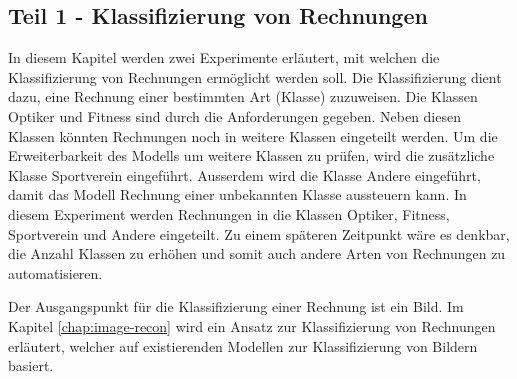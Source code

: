 \subsection{Teil 1 - Klassifizierung von Rechnungen}

In diesem Kapitel werden zwei Experimente erläutert, mit welchen die Klassifizierung von Rechnungen ermöglicht werden soll. Die Klassifizierung dient dazu, eine Rechnung einer bestimmten Art (Klasse) zuzuweisen. Die Klassen Optiker und Fitness sind durch die Anforderungen gegeben. Neben diesen Klassen könnten Rechnungen noch in weitere Klassen eingeteilt werden. Um die Erweiterbarkeit des Modells um weitere Klassen zu prüfen, wird die zusätzliche Klasse Sportverein eingeführt. Ausserdem wird die Klasse Andere eingeführt, damit das Modell Rechnung einer unbekannten Klasse aussteuern kann. In diesem Experiment werden Rechnungen in die Klassen Optiker, Fitness, Sportverein und Andere eingeteilt. Zu einem späteren Zeitpunkt wäre es denkbar, die Anzahl Klassen zu erhöhen und somit auch andere Arten von Rechnungen zu automatisieren.

Der Ausgangspunkt für die Klassifizierung einer Rechnung ist ein Bild. Im Kapitel \ref{chap:image-recon} wird ein Ansatz zur Klassifizierung von Rechnungen erläutert, welcher auf existierenden Modellen zur Klassifizierung von Bildern basiert.




